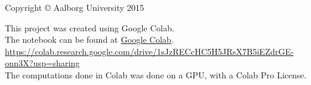 \documentclass[12pt, a4paper, openright]{report}
\begin{document}
\thispagestyle{empty}
\small
\strut\vfill
\noindent Copyright \copyright{} Aalborg University 2015\par
\vspace{0.2cm}
\noindent This project was created using Google Colab.\\
The notebook can be found at \href{https://colab.research.google.com/drive/1sJzRECcHC5H5JRsX7B5iEZdrGE-onn3X#scrollTo=RUfZZPrGUZoH}{Google Colab}.\\
\url{https://colab.research.google.com/drive/1sJzRECcHC5H5JRsX7B5iEZdrGE-onn3X?usp=sharing} \\
The computations done in Colab was done on a GPU, with a Colab Pro License.
\clearpage


\tableofcontents
\end{document}
